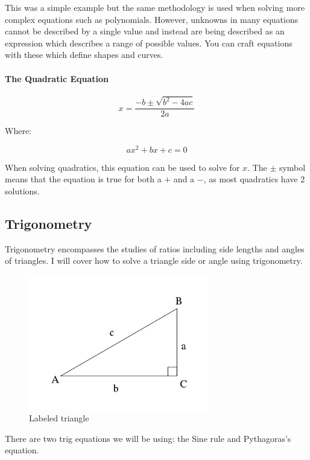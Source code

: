 This was a simple example but the same methodology is used when solving more complex equations such as polynomials. However, unknowns in many equations cannot be described by a single value and instead are being described as an expression which describes a range of possible values. You can craft equations with these which define shapes and curves.

\hypertarget{the-quadratic-equation}{%
\paragraph{The Quadratic Equation}\label{the-quadratic-equation}}

\[x=\frac{-b\pm\sqrt{b^2-4ac}}{2a}\]

Where:

\[ax^2+bx+c=0\]

When solving quadratics, this equation can be used to solve for \(x\). The \(\pm\) symbol means that the equation is true for both a \(+\) and a \(-\), as most quadratics have 2 solutions.

\hypertarget{trigonometry}{%
\subsection{Trigonometry}\label{trigonometry}}

Trigonometry encompasses the studies of ratios including side lengths and angles of triangles. I will cover how to solve a triangle side or angle using trigonometry.

\begin{figure}
\includegraphics[width=0.7\textwidth,height=\textheight]{./images/trig_triangle.png}
\caption{Labeled triangle}
\end{figure}

There are two trig equations we will be using: the Sine rule and Pythagoras's equation.

